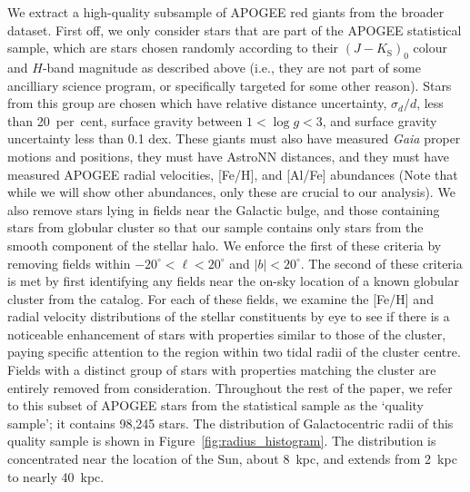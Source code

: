 We extract a high-quality subsample of APOGEE red giants from the broader dataset. First off, we only consider stars that are part of the APOGEE statistical sample, which are stars chosen randomly according to their $(J-K_\mathrm{S})_{0}$ colour and $H$-band magnitude as described above (i.e., they are not part of some ancilliary science program, or specifically targeted for some other reason). Stars from this group are chosen which have relative distance uncertainty, $\sigma_{d}/d$, less than 20~per~cent, surface gravity between $1 < \log g < 3$, and surface gravity uncertainty less than 0.1 dex. These giants must also have measured \textit{Gaia} proper motions and positions, they must have AstroNN distances, and they must have measured APOGEE radial velocities, [Fe/H], and [Al/Fe] abundances (Note that while we will show other abundances, only these are crucial to our analysis). We also remove stars lying in fields near the Galactic bulge, and those containing stars from globular cluster so that our sample contains only stars from the smooth component of the stellar halo. We enforce the first of these criteria by removing fields within $-20^{\circ} < \ell < 20^{\circ}$ and $|b| < 20^{\circ}$. The second of these criteria is met by first identifying any fields near the on-sky location of a known globular cluster from the \textcite[][December 2010 version]{harris96} catalog. For each of these fields, we examine the [Fe/H] and radial velocity distributions of the stellar constituents by eye to see if there is a noticeable enhancement of stars with properties similar to those of the cluster, paying specific attention to the region within two tidal radii of the cluster centre. Fields with a distinct group of stars with properties matching the cluster are entirely removed from consideration. Throughout the rest of the paper, we refer to this subset of APOGEE stars from the statistical sample as the `quality sample'; it contains 98,245 stars. The distribution of Galactocentric radii of this quality sample is shown in Figure~\ref{fig:radius_histogram}. The distribution is concentrated near the location of the Sun, about 8~kpc, and extends from 2~kpc to nearly 40~kpc.

